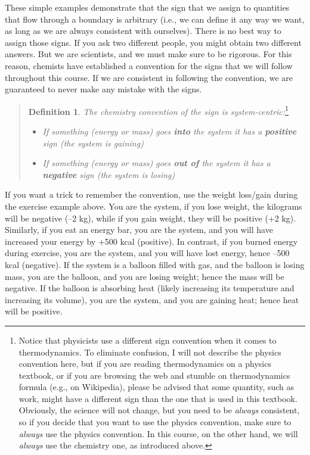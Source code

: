 \documentclass[
  9pt,
]{extbook}
\providecommand{\tightlist}{%
  \setlength{\itemsep}{0pt}\setlength{\parskip}{0pt}}
\theoremstyle{definition}
\newtheorem{definition}{Definition}[chapter]
\theoremstyle{definition}
\theoremstyle{definition}
\theoremstyle{remark}
\begin{document}
These simple examples demonstrate that the sign that we assign to quantities that flow through a boundary is arbitrary (i.e., we can define it any way we want, as long as we are always consistent with ourselves). There is no best way to assign those signs. If you ask two different people, you might obtain two different answers. But we are scientists, and we must make sure to be rigorous. For this reason, chemists have established a convention for the signs that we will follow throughout this course. If we are consistent in following the convention, we are guaranteed to never make any mistake with the signs.

\begin{quote}
\begin{definition}
\protect\hypertarget{def:chemistryconv}{}{\label{def:chemistryconv} }\emph{The chemistry convention of the sign is system-centric:}\footnote{Notice that physicists use a different sign convention when it comes to thermodynamics. To eliminate confusion, I will not describe the physics convention here, but if you are reading thermodynamics on a physics textbook, or if you are browsing the web and stumble on thermodynamics formula (e.g., on Wikipedia), please be advised that some quantity, such as work, might have a different sign than the one that is used in this textbook. Obviously, the science will not change, but you need to be \emph{always} consistent, so if you decide that you want to use the physics convention, make sure to \emph{always} use the physics convention. In this course, on the other hand, we will \emph{always} use the chemistry one, as introduced above.}

\begin{itemize}
\tightlist
\item
  \emph{If something (energy or mass) goes \textbf{into} the system it has a \textbf{positive} sign (the system is gaining)}
\item
  \emph{If something (energy or mass) goes \textbf{out of} the system it has a \textbf{negative} sign (the system is losing)}
\end{itemize}
\end{definition}
\end{quote}

If you want a trick to remember the convention, use the weight loss/gain during the exercise example above. You are the system, if you lose weight, the kilograms will be negative (--2 kg), while if you gain weight, they will be positive (+2 kg). Similarly, if you eat an energy bar, you are the system, and you will have increased your energy by +500 kcal (positive). In contrast, if you burned energy during exercise, you are the system, and you will have lost energy, hence --500 kcal (negative). If the system is a balloon filled with gas, and the balloon is losing mass, you are the balloon, and you are losing weight; hence the mass will be negative. If the balloon is absorbing heat (likely increasing its temperature and increasing its volume), you are the system, and you are gaining heat; hence heat will be positive.
\end{document}
